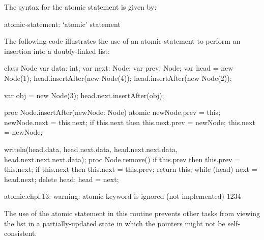 The syntax for the atomic statement is given by:
\begin{syntax}
atomic-statement:
  `atomic' statement
\end{syntax}

\begin{example}
The following code illustrates the use of an atomic statement
to perform an insertion into a doubly-linked list:

\begin{chapelpre}
class Node {
  var data: int;
  var next: Node;
  var prev: Node;
}
var head = new Node(1);
head.insertAfter(new Node(4));
head.insertAfter(new Node(2));

var obj = new Node(3);
head.next.insertAfter(obj);
\end{chapelpre}
\begin{chapel}
proc Node.insertAfter(newNode: Node) {
  atomic {
    newNode.prev = this;
    newNode.next = this.next;
    if this.next then this.next.prev = newNode;
    this.next = newNode;
  }
}
\end{chapel}
\begin{chapelpost}
writeln(head.data, head.next.data, head.next.next.data, head.next.next.next.data);
proc Node.remove() {
  if this.prev then this.prev = this.next;
  if this.next then this.next = this.prev;
  return this;
}
while (head) {
  next = head.next;
  delete head;
  head = next;
} 
\end{chapelpost}
\begin{chapeloutput}
atomic.chpl:13: warning: atomic keyword is ignored (not implemented)
1234
\end{chapeloutput}
The use of the atomic statement in this routine prevents other tasks
from viewing the list in a partially-updated state in which the
pointers might not be self-consistent.
\end{example}
